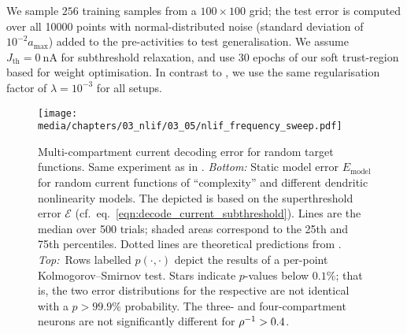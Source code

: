 We sample $256$ training samples from a $100 \times 100$ grid; the test error is computed over all \num{10000} points with normal-distributed noise (standard deviation of $10^{-2} a_\mathrm{max}$) added to the pre-activities to test generalisation.
We assume $J_\mathrm{th} = \SI{0}{\nano\ampere}$ for subthreshold relaxation, and use $30$ epochs of our soft trust-region based \SQP for weight optimisation.
In contrast to , we use the same regularisation factor of $\lambda = 10^{-3}$ for all setups.

\begin{figure}
	\centering
	\texttt{[image: media/chapters/03\_nlif/03\_05/nlif\_frequency\_sweep.pdf]}
	\caption[Multi-compartment current decoding error for random target functions]{Multi-compartment current decoding error for random target functions. Same experiment as in .
	\emph{Bottom:}
	Static model error $E_\mathrm{model}$ for random current functions of \enquote{complexity} \slc and different \nlif dendritic nonlinearity models.
	The depicted \NRMSE is based on the superthreshold error $\mathcal{E}$ (cf.~eq.~\ref{eqn:decode_current_subthreshold}).
	Lines are the median over \num{500} trials; shaded areas correspond to the 25th and 75th percentiles.
	Dotted lines are theoretical predictions from .
	\emph{Top:}~Rows labelled $p(\cdot, \cdot)$ depict the results of a per-point Kolmogorov–Smirnov test.
	Stars indicate $p$-values below $0.1\%$; that is, the two error distributions for the respective \slc are not identical with a $p > 99.9\%$ probability.
	The three- and four-compartment neurons are not significantly different for ${\rho^{-1}} > 0.4$.
	}
	\label{fig:nlif_frequency_sweep}
\end{figure}

